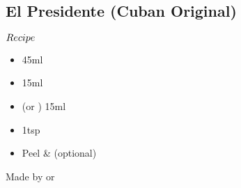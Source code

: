 \subsection{El Presidente (Cuban Original)}
\begin{itembox}[l]{\boldmath $Recipe$}
\begin{itemize}
\setlength{\parskip}{0cm}
\setlength{\itemsep}{0cm}
\item \lrum 45ml
\item \vermouth 15ml
\item \oc (or \wc) 15ml
\item \gs 1tsp
\item \orange Peel \& \cherry (optional)
\end{itemize}
\vspace{-4mm}
Made by \shake or \stir
\end{itembox}
